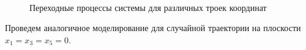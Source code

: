 \documentclass[14pt,a4paper]{extarticle}
\begin{document}
\begin{example}
		\begin{figure}[h]
			\centering
			\\
			\caption{Переходные процессы системы для различных троек координат}
			\label{fig:in_D_3d}
		\end{figure}
		
		Проведем аналогичное моделирование для случайной траектории на плоскости $x_1=x_3=x_5=0$.
		\newpage
		

\end{example}
\end{document}

